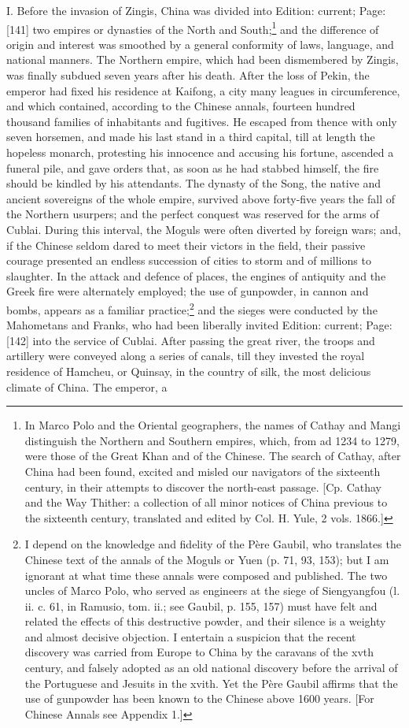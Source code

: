I. Before the invasion of Zingis, China was divided into Edition: current; Page: [141] two empires or dynasties of the North and South;\footnote{In Marco Polo and the Oriental geographers, the names of Cathay and Mangi distinguish the Northern and Southern empires, which, from ad 1234 to 1279, were those of the Great Khan and of the Chinese. The search of Cathay, after China had been found, excited and misled our navigators of the sixteenth century, in their attempts to discover the north-east passage. [Cp. Cathay and the Way Thither: a collection of all minor notices of China previous to the sixteenth century, translated and edited by Col. H. Yule, 2 vols. 1866.]} and the difference of origin and interest was smoothed by a general conformity of laws, language, and national manners. The Northern empire, which had been dismembered by Zingis, was finally subdued seven years after his death. After the loss of Pekin, the emperor had fixed his residence at Kaifong, a city many leagues in circumference, and which contained, according to the Chinese annals, fourteen hundred thousand families of inhabitants and fugitives. He escaped from thence with only seven horsemen, and made his last stand in a third capital, till at length the hopeless monarch, protesting his innocence and accusing his fortune, ascended a funeral pile, and gave orders that, as soon as he had stabbed himself, the fire should be kindled by his attendants. The dynasty of the Song, the native and ancient sovereigns of the whole empire, survived above forty-five years the fall of the Northern usurpers; and the perfect conquest was reserved for the arms of Cublai. During this interval, the Moguls were often diverted by foreign wars; and, if the Chinese seldom dared to meet their victors in the field, their passive courage presented an endless succession of cities to storm and of millions to slaughter. In the attack and defence of places, the engines of antiquity and the Greek fire were alternately employed; the use of gunpowder, in cannon and bombs, appears as a familiar practice;\footnote{I depend on the knowledge and fidelity of the Père Gaubil, who translates the Chinese text of the annals of the Moguls or Yuen (p. 71, 93, 153); but I am ignorant at what time these annals were composed and published. The two uncles of Marco Polo, who served as engineers at the siege of Siengyangfou (l. ii. c. 61, in Ramusio, tom. ii.; see Gaubil, p. 155, 157) must have felt and related the effects of this destructive powder, and their silence is a weighty and almost decisive objection. I entertain a suspicion that the recent discovery was carried from Europe to China by the caravans of the xvth century, and falsely adopted as an old national discovery before the arrival of the Portuguese and Jesuits in the xvith. Yet the Père Gaubil affirms that the use of gunpowder has been known to the Chinese above 1600 years. [For Chinese Annals see Appendix 1.]} and the sieges were conducted by the Mahometans and Franks, who had been liberally invited Edition: current; Page: [142] into the service of Cublai. After passing the great river, the troops and artillery were conveyed along a series of canals, till they invested the royal residence of Hamcheu, or Quinsay, in the country of silk, the most delicious climate of China. The emperor, a 